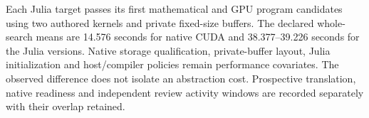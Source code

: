 Each Julia target passes its first mathematical and GPU program candidates using two authored kernels and private fixed-size buffers. The declared whole-search means are 14.576 seconds for native CUDA and 38.377--39.226 seconds for the Julia versions. Native storage qualification, private-buffer layout, Julia initialization and host/compiler policies remain performance covariates. The observed difference does not isolate an abstraction cost. Prospective translation, native readiness and independent review activity windows are recorded separately with their overlap retained.
